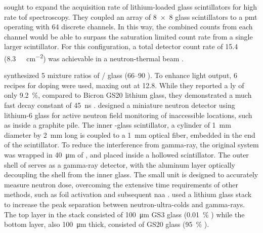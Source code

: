\documentclass[../../../main.tex]{subfiles}%
\begin{document}
    \citeauthor*{Mizukami_2004} sought to expand the acquisition rate of lithium-loaded glass scintillators for high rate \gls{tof} spectroscopy. 
    They coupled an array of \num{8x8} glass scintillators to a \gls{pmt} operating with \num{64} discrete channels.
    In this way, the combined counts from each channel would be able to surpass the saturation limited count rate from a single larger scintillator.
    For this configuration, a total detector count rate of \SI{15.4}{\mega\countrate} (\SI{8.3}{\mega\countrate\per\centi\meter\squared}) was achievable in a \gls{neutron-thermal} beam \cite{Mizukami_2004}.    
    \par%
    \citeauthor*{Ishii_2005} synthesized \num{5} mixture ratios of / glass (\SIrange{66}{90}{\percentweight} ).
    To enhance light output, \num{6} recipes for  doping were used, maxing out at \SI{12.8}{\percentmole}.
    While they reported a \gls{ly} of only \SI{9.2}{\percent}, compared to Bicron GS20 lithium glass, they demonstrated a much fast decay constant of \SI{45}{\nano\second} \cite{Ishii_2005}.
    \citeauthor*{Matsumoto_2005} designed a miniature neutron detector using lithium-6 glass for active neutron field monitoring of inaccessible locations, such as inside a graphite pile.
    The inner -glass scintillator, a cylinder of \SI{1}{\milli\meter} diameter by \SI{2}{\milli\meter} long is coupled to a \SI{1}{\milli\meter} optical fiber, embedded in the end of the scintillator.
    To reduce the interference from \gls{gamma-ray}, the original system was wrapped in \SI{40}{\micro\meter} of , and placed inside a hollowed  scintillator.
    The outer shell of  serves as a \gls{gamma-ray} detector, with the aluminum layer optically decoupling the shell from the inner  glass.
    The small unit is designed to accurately measure neutron dose, overcoming the extensive time requirements of other methods, such as foil activation and subsequent \gls{naa} \cite{Matsumoto_2005}.   
    \citeauthor*{Ban_2009} used a lithium glass stack to increase the peak separation between \glspl{neutron-ultra-cold} and \glspl{gamma-ray}.
    The top layer in the stack consisted of \SI{100}{\micro\meter} GS3 glass (\SI{0.01}{\percent} ) while the bottom layer, also \SI{100}{\micro\meter} thick, consisted of GS20 glass (\SI{95}{\percent} ).
\end{document}
